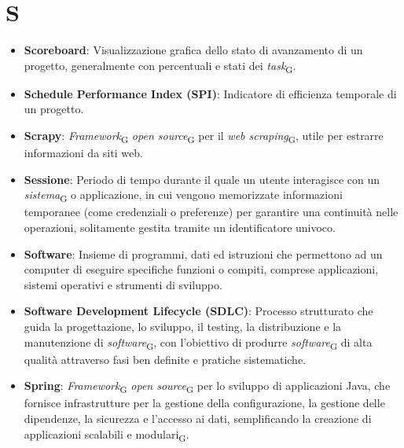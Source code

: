 \section{S}
\begin{itemize}
    \item \textbf{Scoreboard}: Visualizzazione grafica dello stato di avanzamento di un progetto, generalmente con percentuali e stati dei \textit{task}\textsubscript{G}.
    \item \textbf{Schedule Performance Index (SPI)}: Indicatore di efficienza temporale di un progetto.
    \item \textbf{Scrapy}: \textit{Framework}\textsubscript{G} \textit{open source}\textsubscript{G} per il \textit{web scraping}\textsubscript{G}, utile per estrarre informazioni da siti web.
    \item \textbf{Sessione}: Periodo di tempo durante il quale un utente interagisce con un \textit{sistema}\textsubscript{G} o applicazione, in cui vengono memorizzate informazioni temporanee (come credenziali o preferenze) per garantire una continuità nelle operazioni, solitamente gestita tramite un identificatore univoco.
    \item \textbf{Software}: Insieme di programmi, dati ed istruzioni che permettono ad un computer di eseguire specifiche funzioni o compiti, comprese applicazioni, sistemi operativi e strumenti di sviluppo.
    \item \textbf{Software Development Lifecycle (SDLC)}: Processo strutturato che guida la progettazione, lo sviluppo, il testing, la distribuzione e la manutenzione di \textit{software}\textsubscript{G}, con l'obiettivo di produrre \textit{software}\textsubscript{G} di alta qualità attraverso fasi ben definite e pratiche sistematiche.
    \item \textbf{Spring}: \textit{Framework}\textsubscript{G} \textit{open source}\textsubscript{G} per lo sviluppo di applicazioni Java, che fornisce infrastrutture per la gestione della configurazione, la gestione delle dipendenze, la sicurezza e l'accesso ai dati, semplificando la creazione di applicazioni scalabili e modulari\textsubscript{G}.

\end{itemize}
